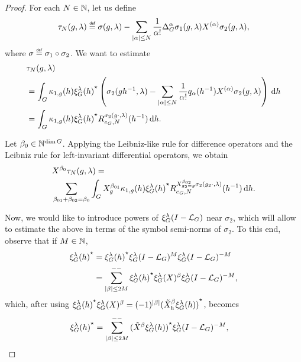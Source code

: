 \begin{proof}
    For each $N \in \mathbb{N}$,
    let us define
    \begin{align*}
        \tau_N(g, \lambda) \defeq
        \sigma(g, \lambda) - \sum_{\abs \alpha \leq N} \frac 1 {\alpha!} \DifferenceOperatorOrder \alpha \sigma_1(g, \lambda) \TaylorLeftDifferentialOperator \alpha \sigma_2(g, \lambda),
    \end{align*}
    where $\sigma \defeq \sigma_1 \circ \sigma_2$.
    We want to estimate
    \begin{align}
        &\tau_N(g, \lambda) \notag\\
        &= \int_G \kappa_{1, g}(h) {\xi^{\lambda}_{G}(h)}^\star
        \left(\sigma_2(g h^{-1}, \lambda) - \sum_{\left|{\alpha}\right| \leq N} \frac 1 {\alpha!} q_\alpha(h^{-1}) X^{(\alpha)} \sigma_2(g, \lambda)\right) \,\mathrm{d} h \notag\\
        &= \int_G \kappa_{1, g}(h) {\xi^{\lambda}_{G}(h)}^\star R^{\sigma_2(g \cdot, \lambda)}_{e_G, N} (h^{-1}) \,\mathrm{d} h.
        \label{eq:remainder_of_composition_formula}
    \end{align}

    Let $\beta_0 \in \mathbb{N}^{\dim G}$.
    Applying the Leibniz-like rule for difference operators
    and the Leibniz rule for left-invariant differential operators,
    we obtain
    \begin{align*}
        &\LeftDifferentialOperator {\beta_0} \tau_N(g, \lambda) =\\
        &\sum_{%
                \beta_{01} + \beta_{02} = \beta_0
        }
        \int_\Group \LeftDifferentialOperator [g] {\beta_{01}} \kappa_{1, g}(h) \adj{\Rep \lambda(h)}
        \TaylorRemainder {\LeftDifferentialOperator [g_2 = g] {\beta_{02}} \sigma_2(g_2 \dummy, \lambda)} {e_\Group} N (h^{-1}) \dd h.
    \end{align*}

    Now, we would like to introduce powers of $\xi^{\lambda}_{G} (I - {\mathcal{L}_{G}})^{}$ near $\sigma_2$,
    which will allow to estimate the above in terms of the symbol semi-norms of $\sigma_2$.
    To this end,
    observe that if $M \in \mathbb{N}$,
    \begin{align*}
        {\xi^{\lambda}_{G}(h)}^\star
        &= {\xi^{\lambda}_{G}(h)}^\star \xi^{\lambda}_{G} (I - {\mathcal{L}_{G}})^{M} \xi^{\lambda}_{G} (I - {\mathcal{L}_{G}})^{-M}\\
        &= \sum_{\left|{\beta}\right| \leq 2 M}^{--} {\xi^{\lambda}_{G}(h)}^\star \xi^{\lambda}_{G}(X)^\beta \xi^{\lambda}_{G} (I - {\mathcal{L}_{G}})^{-M},
    \end{align*}
    which, after using $\adj {\Rep \lambda(h)} \Rep \lambda (X)^\beta = (-1)^{\abs \beta} \adj {(\RightDifferentialOperator[h] \beta \Rep \lambda (h))}$, becomes
    \begin{align*}
        \adj{\Rep \lambda(h)}
        &=
        \lcsum{\abs \beta \leq 2 M}
        \adj{(\RightDifferentialOperator \beta \Rep \lambda(h))} \Rep \lambda \BesselPotentialSquared {-M},
    \end{align*}


\end{proof}
